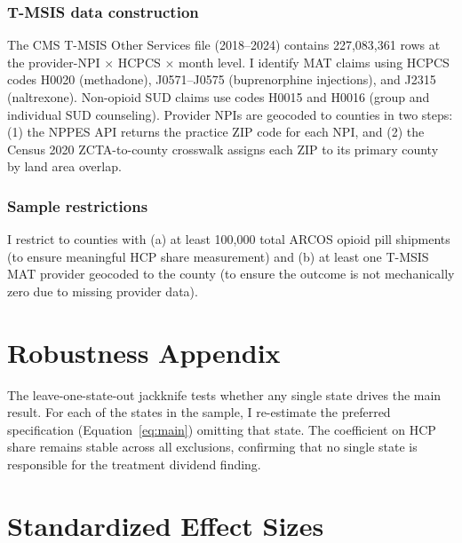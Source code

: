 \documentclass[12pt]{article}
\begin{document}
\subsubsection*{T-MSIS data construction}  The CMS T-MSIS Other Services file (2018--2024) contains 227,083,361 rows at the provider-NPI $\times$ HCPCS $\times$ month level. I identify MAT claims using HCPCS codes H0020 (methadone), J0571--J0575 (buprenorphine injections), and J2315 (naltrexone). Non-opioid SUD claims use codes H0015 and H0016 (group and individual SUD counseling). Provider NPIs are geocoded to counties in two steps: (1) the NPPES API returns the practice ZIP code for each NPI, and (2) the Census 2020 ZCTA-to-county crosswalk assigns each ZIP to its primary county by land area overlap.

\subsubsection*{Sample restrictions}  I restrict to counties with (a) at least 100,000 total ARCOS opioid pill shipments (to ensure meaningful HCP share measurement) and (b) at least one T-MSIS MAT provider geocoded to the county (to ensure the outcome is not mechanically zero due to missing provider data).

\section{Robustness Appendix}

The leave-one-state-out jackknife tests whether any single state drives the main result. For each of the states in the sample, I re-estimate the preferred specification (Equation~\ref{eq:main}) omitting that state. The coefficient on HCP share remains stable across all exclusions, confirming that no single state is responsible for the treatment dividend finding.

\section{Standardized Effect Sizes}
\label{sec:sde}


\end{document}

